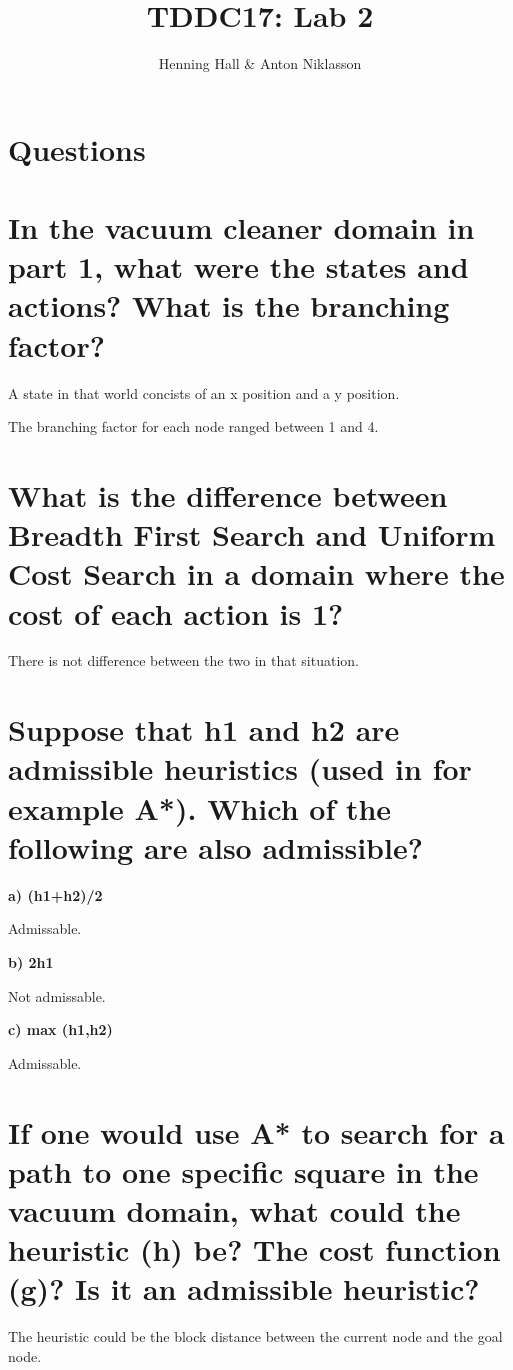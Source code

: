 \documentclass{article}
\begin{document}
\title{TDDC17: Lab 2}
\author{Henning Hall \& Anton Niklasson}
\maketitle


\section*{Questions}

\section*{In the vacuum cleaner domain in part 1, what were the states and actions? What is the branching factor?}

A state in that world concists of an x position and a y position.

The branching factor for each node ranged between 1 and 4.

\section*{What is the difference between Breadth First Search and Uniform Cost Search in a domain where the cost of each action is 1?}

There is not difference between the two in that situation.

\section*{Suppose that h1 and h2 are admissible heuristics (used in for example A*). Which of the following are also admissible?}
\textbf{a) (h1+h2)/2}

Admissable.

\textbf{b) 2h1}

Not admissable.

\textbf{c) max (h1,h2)}

Admissable.

\section*{If one would use A* to search for a path to one specific square in the vacuum domain, what could the heuristic (h) be? The cost function (g)? Is it an admissible heuristic?}

The heuristic could be the block distance between the current node and the goal node.
\end{document}
